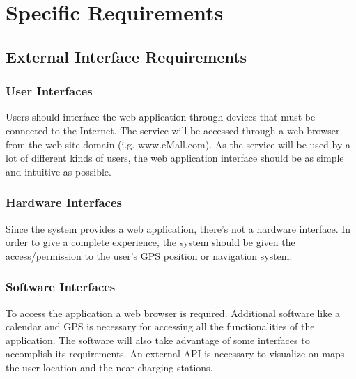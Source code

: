 \documentclass[table, 12pt]{article} %
\begin{document}
    
    
    
    \newpage
    \section{Specific Requirements}
    
    \subsection{External Interface Requirements}

    \subsubsection{User Interfaces}
    Users should interface the web application through devices that must be connected to the Internet. The service will be accessed through a web browser from the web site domain (i.g. www.eMall.com).
    As the service will be used by a lot of different kinds of users, the web application interface should be as simple and intuitive as possible.
    

    \subsubsection{Hardware Interfaces}
    \label{hardware_interfaces}
    Since the system provides a web application, there's not a hardware interface. 
    In order to give a complete experience, the system should be given the access/permission to the user's GPS position or navigation system.  

    \subsubsection{Software Interfaces}
    \label{software_interfaces}
    To access the application a web browser is required. Additional software like a calendar and GPS is necessary for accessing all the functionalities of the application. The software will also take advantage of some interfaces to accomplish its requirements. An external API is necessary to visualize on maps the user location and the near charging stations. %
    
    \newpage
\end{document}
